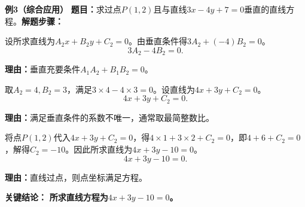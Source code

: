 \begin{examplebox}
	\medskip
	\textbf{\textcolor{CExample}{例3（综合应用）}}
	\textbf{\textcolor{CExample}{题目：}}求过点$P(1,2)$且与直线$3x-4y+7=0$垂直的直线方程。\textbf{\textcolor{CExample}{解题步骤：}}
	\begin{description}[style=nextline, leftmargin=2.8em, labelsep=0.5em, itemsep=0.45em]
		\item[\textbf{第一步（设直线系数）：}]
		      设所求直线为$A_2x+B_2y+C_2=0$。由垂直条件得$3A_2+(-4)B_2=0$。
		      \[
			      3A_2-4B_2=0.
		      \]
		      \par\textbf{理由：}垂直充要条件$A_1A_2+B_1B_2=0$。
		\item[\textbf{第二步（取一组系数）：}]
		      取$A_2=4,B_2=3$，满足$3\times4-4\times3=0$。设直线为$4x+3y+C_2=0$。
		      \[
			      4x+3y+C_2=0.
		      \]
		      \par\textbf{理由：}满足垂直条件的系数不唯一，通常取最简整数比。
		\item[\textbf{第三步（求常数项）：}]
		      将点$P(1,2)$代入$4x+3y+C_2=0$，得$4\times1+3\times2+C_2=0$，即$4+6+C_2=0$，解得$C_2=-10$。因此所求直线为$4x+3y-10=0$。
		      \[
			      4x+3y-10=0.
		      \]
		      \par\textbf{理由：}直线过点，则点坐标满足方程。
	\end{description}
	\textbf{\textcolor{CExample}{关键结论：}}
	\textbf{所求直线方程为$4x+3y-10=0$。}
\end{examplebox}